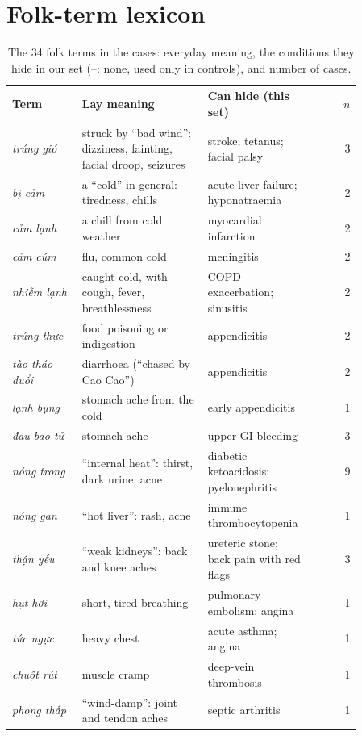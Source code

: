 \documentclass[runningheads]{llncs}
\newcommand{\vi}[1]{\textit{#1}}   %
\begin{document}
\section{Folk-term lexicon}\label{app:lexicon}
\begin{table}[h]\centering\scriptsize
\caption{The 34 folk terms in the cases: everyday meaning, the conditions they hide in our set (--: none, used only in controls), and number of cases.}\label{tab:lexicon}
\begin{tabular}{p{0.2\linewidth}p{0.36\linewidth}p{0.3\linewidth}r}\toprule
Term & Lay meaning & Can hide (this set) & $n$ \\\midrule
\vi{trúng gió} & struck by ``bad wind'': dizziness, fainting, facial droop, seizures & stroke; tetanus; facial palsy & 3 \\
\vi{bị cảm} & a ``cold'' in general: tiredness, chills & acute liver failure; hyponatraemia & 2 \\
\vi{cảm lạnh} & a chill from cold weather & myocardial infarction & 2 \\
\vi{cảm cúm} & flu, common cold & meningitis & 2 \\
\vi{nhiễm lạnh} & caught cold, with cough, fever, breathlessness & COPD exacerbation; sinusitis & 2 \\
\vi{trúng thực} & food poisoning or indigestion & appendicitis & 2 \\
\vi{tào tháo đuổi} & diarrhoea (``chased by Cao Cao'') & appendicitis & 2 \\
\vi{lạnh bụng} & stomach ache from the cold & early appendicitis & 1 \\
\vi{đau bao tử} & stomach ache & upper GI bleeding & 3 \\
\vi{nóng trong} & ``internal heat'': thirst, dark urine, acne & diabetic ketoacidosis; pyelonephritis & 9 \\
\vi{nóng gan} & ``hot liver'': rash, acne & immune thrombocytopenia & 1 \\
\vi{thận yếu} & ``weak kidneys'': back and knee aches & ureteric stone; back pain with red flags & 3 \\
\vi{hụt hơi} & short, tired breathing & pulmonary embolism; angina & 1 \\
\vi{tức ngực} & heavy chest & acute asthma; angina & 1 \\
\vi{chuột rút} & muscle cramp & deep-vein thrombosis & 1 \\
\vi{phong thấp} & ``wind-damp'': joint and tendon aches & septic arthritis & 1 \\

\end{tabular}
\end{table}
\end{document}
